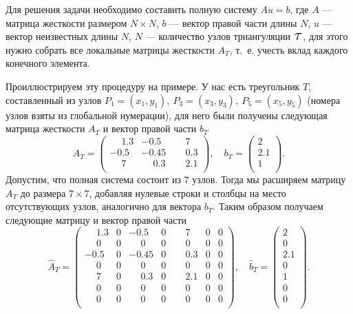 \documentclass[12pt, a4paper]{article}
\newcommand\Tau{\scalerel*{\tau}{T}}
\begin{document}
				\noindent
				Для решения задачи необходимо составить полную систему $Au = b$, где $A$ --- матрица жесткости размером $N \times N$, $b$ --- вектор правой части длины $N$, $u$ --- вектор неизвестных длины $N$, $N$ --- количество узлов триангуляции $\Tau$, для этого нужно собрать все локальные матрицы жесткости $A_T$, т.~е. учесть вклад каждого конечного элемента.
				
				Проиллюстрируем эту процедуру на примере. У нас есть треугольник $T$, составленный из узлов $P_1 = (x_1, y_1), \ P_3 = (x_3, y_3), \ P_5 = (x_5, y_5)$ (номера узлов взяты из глобальной нумерации), для него были получены следующая матрица жесткости $A_T$ и вектор правой части $b_T$
				\begin{equation*}
					A_T = \begin{pmatrix}
						\phantom{-}1.3 & -0.5 & \phantom{-}7 \\
						-0.5 & -0.45 & \phantom{-}0.3 \\
						\phantom{-}7 & \phantom{-}0.3 & \phantom{-}2.1 \\
					\end{pmatrix},
					\quad
					b_T = \begin{pmatrix}
						2 \\
						2.1 \\
						1 \\
					\end{pmatrix}.
				\end{equation*}
				Допустим, что полная система состоит из 7 узлов. Тогда мы расширяем матрицу $A_T$ до размера $7 \times 7$, добавляя нулевые строки и столбцы на место отсутствующих узлов, аналогично для вектора 
				$b_T$. Таким образом получаем следующие матрицу и вектор правой части
				\begin{equation*}
					\widehat A_T = 
					\begin{pmatrix}
						\phantom{-}1.3 & 0 & -0.5         & 0 & \phantom{-}7   & 0 & 0\\
						  \phantom{-}0 & 0 & \phantom{-}0 & 0 & \phantom{-}0   & 0 & 0\\
						          -0.5 & 0 & -0.45        & 0 & \phantom{-}0.3 & 0 & 0\\
						  \phantom{-}0 & 0 & \phantom{-}0 & 0 & \phantom{-}0   & 0 & 0\\
					   	  \phantom{-}7 & 0 &\phantom{-}0.3& 0 & \phantom{-}2.1 & 0 & 0\\
						  \phantom{-}0 & 0 & \phantom{-}0 & 0 & \phantom{-}0   & 0 & 0\\
						  \phantom{-}0 & 0 & \phantom{-}0 & 0 & \phantom{-}0   & 0 & 0\\
					\end{pmatrix},
					\quad
					\widehat{b}_T = \begin{pmatrix}
						2 \\
						0 \\
						2.1 \\
						0 \\
						1 \\
						0 \\
						0 \\
					\end{pmatrix}.
				\end{equation*}
				
\end{document}

